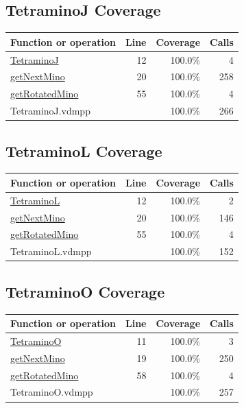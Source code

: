 \documentclass[a4paper]{article}
\begin{document}
\subsection{TetraminoJ Coverage}
\begin{longtable}{|l|r|r|r|}
\hline
Function or operation & Line & Coverage & Calls \\
\hline
\hline
\hyperref[TetraminoJ:12]{TetraminoJ} & 12&100.0\% & 4 \\
\hline
\hyperref[getNextMino:20]{getNextMino} & 20&100.0\% & 258 \\
\hline
\hyperref[getRotatedMino:55]{getRotatedMino} & 55&100.0\% & 4 \\
\hline
\hline
TetraminoJ.vdmpp & & 100.0\% & 266 \\
\hline
\end{longtable}

\subsection{TetraminoL Coverage}
\begin{longtable}{|l|r|r|r|}
\hline
Function or operation & Line & Coverage & Calls \\
\hline
\hline
\hyperref[TetraminoL:12]{TetraminoL} & 12&100.0\% & 2 \\
\hline
\hyperref[getNextMino:20]{getNextMino} & 20&100.0\% & 146 \\
\hline
\hyperref[getRotatedMino:55]{getRotatedMino} & 55&100.0\% & 4 \\
\hline
\hline
TetraminoL.vdmpp & & 100.0\% & 152 \\
\hline
\end{longtable}

\subsection{TetraminoO Coverage}
\begin{longtable}{|l|r|r|r|}
\hline
Function or operation & Line & Coverage & Calls \\
\hline
\hline
\hyperref[TetraminoO:11]{TetraminoO} & 11&100.0\% & 3 \\
\hline
\hyperref[getNextMino:19]{getNextMino} & 19&100.0\% & 250 \\
\hline
\hyperref[getRotatedMino:58]{getRotatedMino} & 58&100.0\% & 4 \\
\hline
\hline
TetraminoO.vdmpp & & 100.0\% & 257 \\
\hline
\end{longtable}
\end{document}
